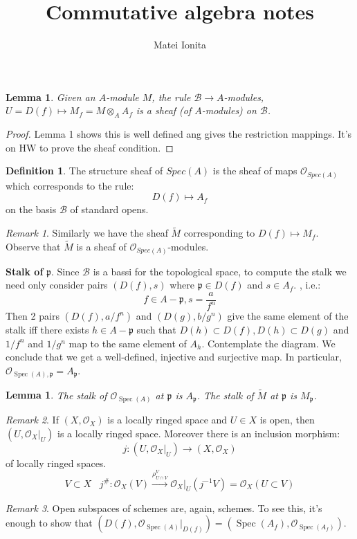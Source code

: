 \documentclass[12 pt]{article}
\title{Commutative algebra notes}
\author{Matei Ionita}
\newcommand{\fr}{\mathfrak}
\DeclareMathOperator{\Spec}{Spec}
\theoremstyle{plain}
\newtheorem{lem}[thm]{Lemma}
\theoremstyle{definition}
\newtheorem{defn}{Definition}
\theoremstyle{remark}
\newtheorem*{rem}{Remark}
\begin{document}
  \maketitle

\begin{lem}
 Given an $A$-module $M$, the rule $\mathcal{B} \to A$-modules, $U = D(f) \mapsto M_f = M \otimes_A A_f$ is a sheaf (of $A$-modules) on $\mathcal{B}$.
\end{lem}
\begin{proof}
Lemma 1 shows this is well defined ang gives the restriction mappings. It's on HW to prove the sheaf condition.
\end{proof}
\begin{defn}
 The structure sheaf of $Spec(A)$ is the sheaf of maps $\mathcal{O}_{Spec(A)}$ which corresponds to the rule:
\[       D(f) \mapsto A_f     \]
on the basis $\mathcal{B}$ of standard opens.
\end{defn}

\begin{rem}
 Similarly we have the sheaf $\tilde M$ corresponding to $D(f) \mapsto M_f$. Observe that $\tilde M$ is a sheaf of $\mathcal{O}_{Spec(A)}$-modules.
\end{rem}

\textbf{Stalk of} $\mathfrak{p}$. Since $\mathcal{B}$ is a bassi for the topological space, to compute the stalk we need only consider pairs $(D(f), s)$ where $\mathfrak{p} \in D(f)$ and $s \in A_f$. , i.e.:
\[       f \in A - \mathfrak{p} , s = \frac{a}{f^n}       \]
Then 2 pairs $(D(f), a/f^n)$ and $(D(g), b/g^n)$ give the same element of the stalk iff there exists $h\in A - \mathfrak{p}$ such that $D(h) \subset D(f), D(h) \subset D(g)$ and $1/f^n$ and $1/g^n$ map to the same element of $A_h$. Contemplate the diagram. We conclude that we get a well-defined, injective and surjective map. In particular, $\mathcal{O}_{\Spec(A), \fr p} = A_{\fr p}$.

\begin{lem}
The stalk of $\mathcal{O}_{\Spec(A)}$ at $\fr p$ is $A_{\fr p}$. The stalk of $\tilde M$ at $\fr p$ is $M_{\fr p}$.
\end{lem}

\begin{rem}
If $(X, \mathcal{O}_X)$ is a locally ringed space and $U\in X$ is open, then $(U,\mathcal{O}_X |_U)$ is a locally ringed space. Moreover there is an inclusion morphism:
\[      j :   (U,\mathcal{O}_X |_U) \to    (X, \mathcal{O}_X)        \]
of locally ringed spaces.
\[         V \subset X \;\;\; j^{\#} : \mathcal{O}_X(V) \overset{\rho^V_{U\cap V}}{\to} \mathcal{O}_X |_{U} (j^{-1} V) = \mathcal{O}_X(U\subset V)        \]
\end{rem}
\begin{rem}
Open subspaces of schemes are, again, schemes. To see this, it's enough to show that $(D(f), \mathcal{O}_{\Spec(A)} |_{D(f)}) = (\Spec (A_f), \mathcal{O}_{\Spec(A_f)})$.
\end{rem}
\end{document}
